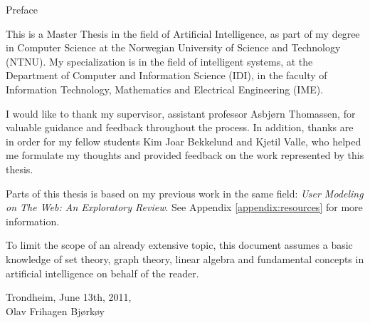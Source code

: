 \null\vspace{7em}
{
  \centering
  \normalfont
  \huge
  Preface\\
}
\vspace{2em}

\noindent
This is a Master Thesis in the field of Artificial Intelligence,
as part of my degree in Computer Science
at the Norwegian University of Science and Technology (NTNU).
My specialization is in the field of intelligent systems, 
at the Department of Computer and Information Science (IDI), 
in the faculty of Information Technology, Mathematics and Electrical Engineering (IME).

I would like to thank my supervisor, assistant professor Asbjørn Thomassen, for valuable guidance and feedback throughout the process.
In addition, thanks are in order for my fellow students 
Kim Joar Bekkelund and Kjetil Valle,
who helped me formulate my thoughts and provided feedback on the work represented by this thesis.

Parts of this thesis is based on my previous work in the same field: 
\emph{User Modeling on The Web: An Exploratory Review}.
See Appendix \ref{appendix:resources} for more information.

To limit the scope of an already extensive topic, 
this document assumes a basic knowledge of set theory, 
graph theory, linear algebra and fundamental concepts in artificial intelligence 
on behalf of the reader.

\vspace{1em}
\begin{flushleft}
  Trondheim, June 13th, 2011,\\
  Olav Frihagen Bjørkøy\\
\end{flushleft}

\cleardoublepage
